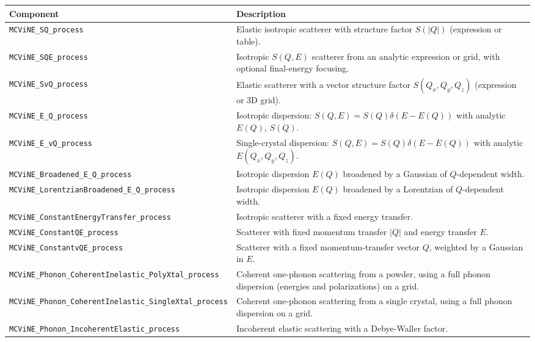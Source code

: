 \begin{table}[htb!]
  \begin{center}
    {\let\my=\\
    \begin{tabular}{|l|p{}|}
      \hline
      \textbf{Component} & \textbf{Description} \\
      \hline
      \texttt{MCViNE\_SQ\_process} & Elastic isotropic scatterer with structure factor $S(|Q|)$ (expression or table). \\
      \texttt{MCViNE\_SQE\_process} & Isotropic $S(Q,E)$ scatterer from an analytic expression or grid, with optional final-energy focusing. \\
      \texttt{MCViNE\_SvQ\_process} & Elastic scatterer with a vector structure factor $S(Q_x,Q_y,Q_z)$ (expression or 3D grid). \\
      \texttt{MCViNE\_E\_Q\_process} & Isotropic dispersion: $S(Q,E)=S(Q)\delta(E-E(Q))$ with analytic $E(Q)$, $S(Q)$. \\
      \texttt{MCViNE\_E\_vQ\_process} & Single-crystal dispersion: $S(Q,E)=S(Q)\delta(E-E(Q))$ with analytic $E(Q_x,Q_y,Q_z)$. \\
      \texttt{MCViNE\_Broadened\_E\_Q\_process} & Isotropic dispersion $E(Q)$ broadened by a Gaussian of $Q$-dependent width. \\
      \texttt{MCViNE\_LorentzianBroadened\_E\_Q\_process} & Isotropic dispersion $E(Q)$ broadened by a Lorentzian of $Q$-dependent width. \\
      \texttt{MCViNE\_ConstantEnergyTransfer\_process} & Isotropic scatterer with a fixed energy transfer. \\
      \texttt{MCViNE\_ConstantQE\_process} & Scatterer with fixed momentum transfer $|Q|$ and energy transfer $E$. \\
      \texttt{MCViNE\_ConstantvQE\_process} & Scatterer with a fixed momentum-transfer vector $Q$, weighted by a Gaussian in $E$. \\
      \texttt{MCViNE\_Phonon\_CoherentInelastic\_PolyXtal\_process} & Coherent one-phonon scattering from a powder, using a full phonon dispersion (energies and polarizations) on a grid. \\
      \texttt{MCViNE\_Phonon\_CoherentInelastic\_SingleXtal\_process} & Coherent one-phonon scattering from a single crystal, using a full phonon dispersion on a grid. \\
      \texttt{MCViNE\_Phonon\_IncoherentElastic\_process} & Incoherent elastic scattering with a Debye-Waller factor. \\

\end{tabular}}
\end{center}
\end{table}
